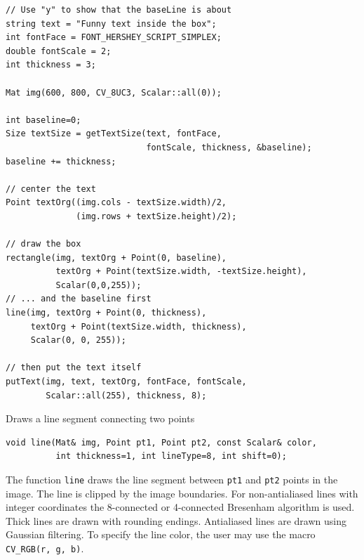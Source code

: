\begin{lstlisting}
// Use "y" to show that the baseLine is about
string text = "Funny text inside the box";
int fontFace = FONT_HERSHEY_SCRIPT_SIMPLEX;
double fontScale = 2;
int thickness = 3;

Mat img(600, 800, CV_8UC3, Scalar::all(0));

int baseline=0;
Size textSize = getTextSize(text, fontFace,
                            fontScale, thickness, &baseline);
baseline += thickness;

// center the text
Point textOrg((img.cols - textSize.width)/2,
              (img.rows + textSize.height)/2);

// draw the box
rectangle(img, textOrg + Point(0, baseline),
          textOrg + Point(textSize.width, -textSize.height),
          Scalar(0,0,255));
// ... and the baseline first
line(img, textOrg + Point(0, thickness),
     textOrg + Point(textSize.width, thickness),
     Scalar(0, 0, 255));

// then put the text itself
putText(img, text, textOrg, fontFace, fontScale,
        Scalar::all(255), thickness, 8);
\end{lstlisting}
        
        
\label{line}
Draws a line segment connecting two points

\begin{lstlisting}
void line(Mat& img, Point pt1, Point pt2, const Scalar& color,
          int thickness=1, int lineType=8, int shift=0);
\end{lstlisting}
\begin{description}
\end{description}

The function \texttt{line} draws the line segment between
\texttt{pt1} and \texttt{pt2} points in the image. The line is
clipped by the image boundaries. For non-antialiased lines
with integer coordinates the 8-connected or 4-connected Bresenham
algorithm is used. Thick lines are drawn with rounding endings.
Antialiased lines are drawn using Gaussian filtering. To specify
the line color, the user may use the macro
\texttt{CV\_RGB(r, g, b)}.


